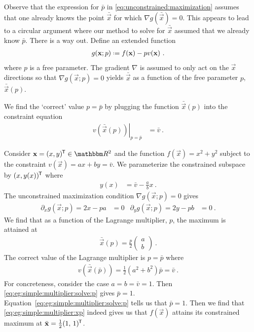 Observe that the expression for $\bar p$ in \eqref{eq:unconstrained:maximization} assumes that one already knows the point $\bar{\vec{x}}$ for which $\nabla g(\bar{\vec{x}})=0$. This appears to lead to a circular argument where our method to solve for $\bar{\vec{x}}$ assumed that we already know $\bar p$. There is a way out. Define an extended function 
\begin{align}
    g(\vec{x};p) \defeq f(\vec{x}) - p v(\vec{x}) \ .
    \label{eq:Lagrange:g:as:free:energy}
\end{align}
where $p$ is a free parameter. The gradient $\nabla$ is assumed to only act on the $\vec{x}$ directions so that $\nabla g(\vec{x};p) =0$ yields $\bar{\vec{x}}$ as a function of the free parameter $p$, $\bar{\vec{x}}(p)$.

We find the `correct' value $p=\bar p$ by plugging the function $\bar{\vec{x}}(p)$ into the constraint equation
\begin{align}
    \left.v(\bar{\vec{x}}(p))\right|_{p=\bar p} &= \bar v \ .
\end{align}

\begin{example}\label{eg:circle:line}
Consider $\vec{x} = (x,y)^{\trans} \in \RR^2$ and the function $f(\vec{x}) = x^2 + y^2$ subject to the constraint $v(\vec{x}) = ax + by = \bar v$. We parameterize the constrained subspace by $(x, y(x))^{{\mkern-1.5mu\mathsf{T}}}$ where
\begin{align}
    y(x) &= \bar v - \frac{a}{b}x \ .
\end{align}
The unconstrained maximization condition $\nabla g(\vec{x};p) = 0$ gives
\begin{align}
    \partial_x g(\vec{x};p) = 2x - pa &=0
    &
    \partial_y g(\vec{x};p) = 2y - pb &=0 \ .
\end{align}
We find that as a function of the Lagrange multiplier, $p$, the maximum is attained at
\begin{align}
    \bar{\vec{x}}(p) =
    \frac{p}{2}
    \begin{pmatrix}
        a\\
        b
    \end{pmatrix}
    \label{eq:eg:simple:multiplier:xp}
    \ .
\end{align}
The correct value of the Lagrange multiplier is $p=\bar p$ where
\begin{align}
    v(\bar{\vec{x}}(\bar p)) =  
    \frac{1}{2}(a^2 + b^2)\bar p
    = \bar v \ .
    \label{eq:eg:simple:multiplier:solve:p}
\end{align}
For concreteness, consider the case $a = b = \bar v = 1$. Then \eqref{eq:eg:simple:multiplier:solve:p} gives $\bar p = 1$. Equation~\eqref{eq:eg:simple:multiplier:solve:p} tells us that $\bar p = 1$. Then we find that \eqref{eq:eg:simple:multiplier:xp} indeed gives us that $f(\vec{x})$ attains its constrained maximum at $\bar{\mathbf{x}} = \tfrac{1}{2}(1, \, 1)^{{\mkern-1.5mu\mathsf{T}}}$. 
\end{example}

